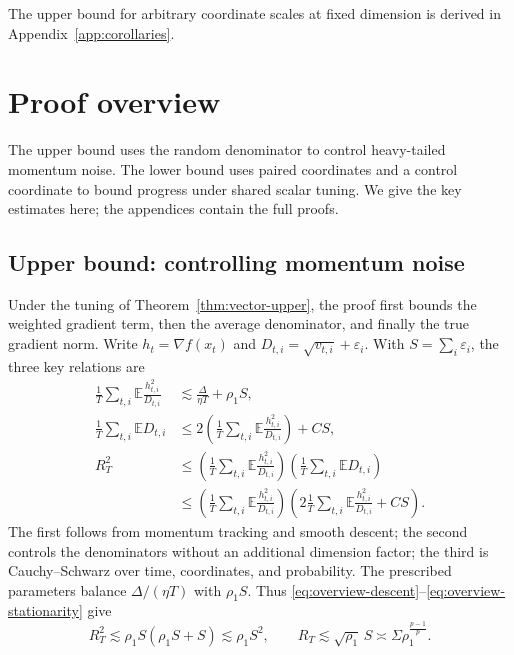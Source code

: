 \documentclass[11pt,letterpaper]{article}
\theoremstyle{definition}
\newcommand{\E}{\mathbb E}
\newcommand{\eps}{\varepsilon}
\newcommand{\grad}{\nabla}
\begin{document}
The upper bound for arbitrary coordinate scales at fixed dimension is derived in Appendix~\ref{app:corollaries}.

\section{Proof overview}
\label{sec:proof-overview}

The upper bound uses the random denominator to control heavy-tailed momentum noise. The lower bound uses paired coordinates and a control coordinate to bound progress under shared scalar tuning. We give the key estimates here; the appendices contain the full proofs.

\subsection{Upper bound: controlling momentum noise}

Under the tuning of Theorem~\ref{thm:vector-upper}, the proof first bounds
the weighted gradient term, then the average denominator, and finally
the true gradient norm. Write $h_t=\grad f(x_t)$ and
$D_{t,i}=\sqrt{v_{t,i}}+\eps_i$.
With $S=\sum_i\eps_i$, the three key relations are
\begin{align}
\frac1T\sum_{t,i}\E\frac{h_{t,i}^2}{D_{t,i}}
&\lesssim\frac{\Delta}{\eta T}+\rho_1S,
\label{eq:overview-descent}\\
\frac1T\sum_{t,i}\E D_{t,i}
&\le2\left(\frac1T\sum_{t,i}\E\frac{h_{t,i}^2}{D_{t,i}}\right)+CS,
\label{eq:overview-denominator}\\
R_T^2&\le
\left(\frac1T\sum_{t,i}\E\frac{h_{t,i}^2}{D_{t,i}}\right)
\left(\frac1T\sum_{t,i}\E D_{t,i}\right)\nonumber\\
&\le
\left(\frac1T\sum_{t,i}\E\frac{h_{t,i}^2}{D_{t,i}}\right)
\left(2\frac1T\sum_{t,i}\E\frac{h_{t,i}^2}{D_{t,i}}+CS\right).
\label{eq:overview-stationarity}
\end{align}
The first follows from momentum tracking and smooth descent; the second
controls the denominators without an additional dimension factor; the
third is Cauchy--Schwarz over time, coordinates, and probability.
The prescribed parameters balance $\Delta/(\eta T)$ with $\rho_1S$.
Thus \eqref{eq:overview-descent}--\eqref{eq:overview-stationarity} give
\[
R_T^2\lesssim\rho_1S(\rho_1S+S)\lesssim\rho_1S^2,
\qquad R_T\lesssim\sqrt{\rho_1}\,S
\asymp\Sigma\rho_1^{\frac{p-1}{p}}.
\]
\end{document}
